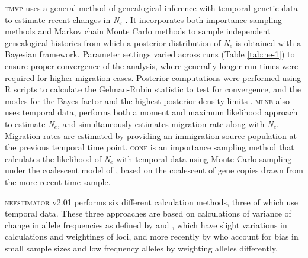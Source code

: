 \textsc{tmvp} uses a general method of genealogical inference with temporal genetic data to 
estimate recent changes in \emph{N}$_e$ \citep{Beaumont:2003}. It incorporates both importance 
sampling methods and Markov chain Monte Carlo methods to sample independent genealogical 
histories from which a posterior distribution of \emph{N}$_e$ is obtained with a Bayesian 
framework. Parameter settings varied across runs (Table \ref{tab:ne-1}) to ensure proper convergence of 
the analysis, where generally longer run times were required for higher migration cases. 
Posterior computations were performed using R scripts to calculate the Gelman-Rubin statistic 
to test for convergence, and the modes for the Bayes factor and the highest posterior density 
limits \citep{Barker:2011}. \textsc{mlne} \citep{Wang:2003} also uses temporal data, performs 
both a moment and maximum likelihood approach to estimate \emph{N}$_e$, and simultaneously 
estimates migration rate along with \emph{N}$_e$. Migration rates are estimated by providing 
an immigration source population at the previous temporal time point. \textsc{cone} \citep{Anderson:2005} 
is an importance sampling method that calculates the likelihood of \emph{N}$_e$ with temporal 
data using Monte Carlo sampling under the coalescent model of \citet{Berthier:2002}, based on 
the coalescent of gene copies drawn from the more recent time sample.

\textsc{neestimator} v2.01 \citep{Do:2014} performs six different calculation methods, three 
of which use temporal data. These three approaches are based on calculations of variance of 
change in allele frequencies as defined by \citet{Nei:1981} and \citet{Pollak:1983}, which 
have slight variations in calculations and weightings of loci, and more recently by \citet{Jorde:2007} 
who account for bias in small sample sizes and low frequency alleles by 
weighting alleles differently.

